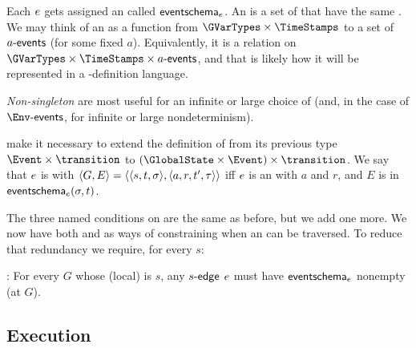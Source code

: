 \documentclass[12pt]{article}
\begin{document}
Each  $e$ gets assigned an  called $\textsf{eventschema}_{e}$. An \EventSchema is a set of \Events that have the same \Action. We may think of an \EventSchema as a function from $\GVarTypes \times \TimeStamps$ to a set of $a\textsf{-events}$ (for some fixed $a$). Equivalently, it is a relation on $\GVarTypes \times \TimeStamps \times \depEvents{a}$, and that is likely how it will be represented in a \Contract-definition language. %

{\it Non-singleton} \EventSchema are most useful for an infinite or large choice of \Actions (and, in the case of $\depEvents{\Env}$, for infinite or large nondeterminism).

\EventSchema make it necessary to extend the definition of \compatible from its previous type $\Event \times \transition$ to $(\GlobalState \times \Event) \times \transition$. We say that \atransition $e$ is  with  $\langle G,E\rangle = \langle\langle s,t,\sigma\rangle,\langle a,r,t',\tau\rangle\rangle$ iff
$e$ is an  with \Action $a$  and \Role $r$, and  $E$ is in $\textsf{eventschema}_{e}(\sigma, t)$.


The three named conditions on \TGuards are the same as before, but we add one more. We now have both \EventSchema and \TGuards as ways of constraining when an \transition can be traversed. To reduce that redundancy we require, for every \State $s$:

\noindent {}: For every \GlobalState $G$ whose (local) \State is $s$, any \enabled $s\textsf{-edge}$ $e$ must have $\textsf{eventschema}_{e}$ nonempty (at $G$).
\medskip

\subsection{Execution} \label{schemasexecution}
\end{document}
